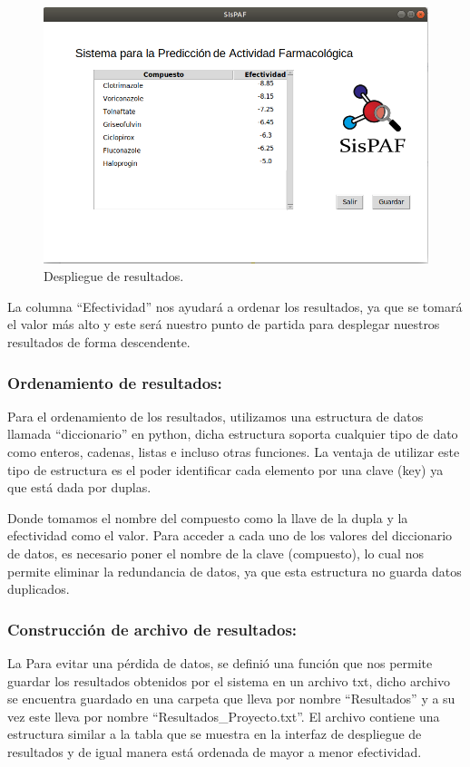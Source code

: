 \begin{figure}[H]
    \centering
    \includegraphics[scale=0.52]{Capitulo4/Documentos/imagenes_generacion/imagen-2-2-7-2.png}
    \caption{Despliegue de resultados.}
    \label{Des_Res}
\end{figure}

\noindent La columna “Efectividad” nos ayudará a ordenar los resultados, ya que se tomará el valor más alto y este será nuestro punto de partida para desplegar nuestros resultados de forma descendente.

\subsubsection{Ordenamiento de resultados:}
\noindent Para el ordenamiento de los resultados, utilizamos una estructura de datos llamada “diccionario” en python, dicha estructura soporta cualquier tipo de dato como enteros, cadenas, listas e incluso otras funciones. La ventaja de utilizar este tipo de estructura es el poder identificar cada elemento por una clave (key) ya que está dada por duplas.

\noindent Donde tomamos el nombre del compuesto como la llave de la dupla y la efectividad como el valor. Para acceder a cada uno de los valores del diccionario de datos, es necesario poner el nombre de la clave (compuesto), lo cual nos permite eliminar la redundancia de datos, ya que esta estructura no guarda datos duplicados.

\subsubsection{Construcción de archivo de resultados:}
\noindent La Para evitar una pérdida de datos, se definió una función que nos permite guardar los resultados obtenidos por el sistema en un archivo txt, dicho archivo se encuentra guardado en una carpeta que lleva por nombre “Resultados” y a su vez este lleva por nombre “Resultados\_Proyecto.txt”. El archivo contiene una estructura similar a la tabla que se muestra en la interfaz de despliegue de resultados y de igual manera está ordenada de mayor a menor efectividad.


